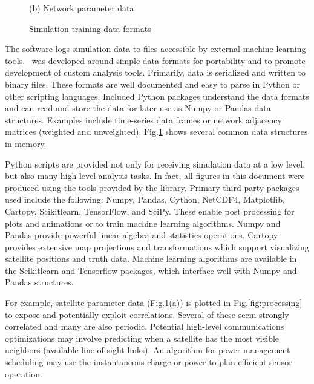 \documentclass[conference]{IEEEtran}
\newcommand{\project}{{\sc{Collaborate}}~}
\begin{document}
\begin{figure}[t]
\begin{minipage}[b]{0.49\linewidth}
\begin{center}
      {\footnotesize(b) Network parameter data}
    \end{center}
  \end{minipage}
  \caption{Simulation training data formats}
  \label{fig:data}
\end{figure}

The software logs simulation data to files accessible by external machine learning tools.  \project was developed around simple data formats for portability and to promote development of custom analysis tools.  Primarily, data is serialized and written to binary files.  These formats are well documented and easy to parse in Python or other scripting languages.  Included Python packages understand the data formats and can read and store the data for later use as Numpy or Pandas data structures.  Examples include time-series data frames or network adjacency matrices (weighted and unweighted).  Fig.\ref{fig:data} shows several common data structures in memory.

Python scripts are provided not only for receiving simulation data at a low level, but also many high level analysis tasks.  In fact, all figures in this document were produced using the tools provided by the library.  Primary third-party packages used include the following: Numpy, Pandas, Cython, NetCDF4, Matplotlib, Cartopy, Scikitlearn, TensorFlow, and SciPy.  These enable post processing for plots and animations or to train machine learning algorithms.  Numpy and Pandas provide powerful linear algebra and statistics operations.  Cartopy provides extensive map projections and transformations which support visualizing satellite positions and truth data.  Machine learning algorithms are available in the Scikitlearn and Tensorflow packages, which interface well with Numpy and Pandas structures.

For example, satellite parameter data (Fig.\ref{fig:data}(a)) is plotted in Fig.\ref{fig:processing} to expose and potentially exploit correlations.  Several of these seem strongly correlated and many are also periodic.  Potential high-level communications optimizations may involve predicting when a satellite has the most visible neighbors (available line-of-sight links).  An algorithm for power management scheduling may use the instantaneous charge or power to plan efficient sensor operation.
\end{document}
